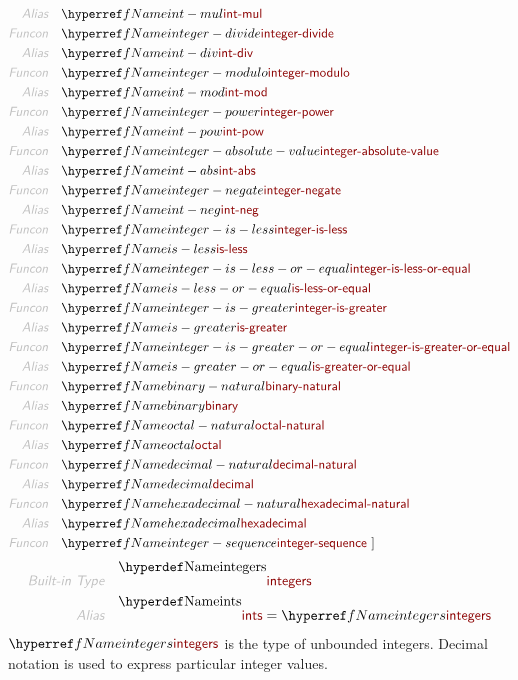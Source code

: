 \begin{align*}
  \KEY{Alias} \quad & \NAMEREF{int-mul} \\
  \KEY{Funcon} \quad & \NAMEREF{integer-divide} \\
  \KEY{Alias} \quad & \NAMEREF{int-div} \\
  \KEY{Funcon} \quad & \NAMEREF{integer-modulo} \\
  \KEY{Alias} \quad & \NAMEREF{int-mod} \\
  \KEY{Funcon} \quad & \NAMEREF{integer-power} \\
  \KEY{Alias} \quad & \NAMEREF{int-pow} \\
  \KEY{Funcon} \quad & \NAMEREF{integer-absolute-value} \\
  \KEY{Alias} \quad & \NAMEREF{int-abs} \\
  \KEY{Funcon} \quad & \NAMEREF{integer-negate} \\
  \KEY{Alias} \quad & \NAMEREF{int-neg} \\
  \KEY{Funcon} \quad & \NAMEREF{integer-is-less} \\
  \KEY{Alias} \quad & \NAMEREF{is-less} \\
  \KEY{Funcon} \quad & \NAMEREF{integer-is-less-or-equal} \\
  \KEY{Alias} \quad & \NAMEREF{is-less-or-equal} \\
  \KEY{Funcon} \quad & \NAMEREF{integer-is-greater} \\
  \KEY{Alias} \quad & \NAMEREF{is-greater} \\
  \KEY{Funcon} \quad & \NAMEREF{integer-is-greater-or-equal} \\
  \KEY{Alias} \quad & \NAMEREF{is-greater-or-equal} \\
  \KEY{Funcon} \quad & \NAMEREF{binary-natural} \\
  \KEY{Alias} \quad & \NAMEREF{binary} \\
  \KEY{Funcon} \quad & \NAMEREF{octal-natural} \\
  \KEY{Alias} \quad & \NAMEREF{octal} \\
  \KEY{Funcon} \quad & \NAMEREF{decimal-natural} \\
  \KEY{Alias} \quad & \NAMEREF{decimal} \\
  \KEY{Funcon} \quad & \NAMEREF{hexadecimal-natural} \\
  \KEY{Alias} \quad & \NAMEREF{hexadecimal} \\
  \KEY{Funcon} \quad & \NAMEREF{integer-sequence}
  \ ]
\end{align*}
\begin{align*}
  \KEY{Built-in Type} \quad 
  & \NAMEDECL{integers}  
\\
  \KEY{Alias} \quad
  & \NAMEDECL{ints} = \NAMEREF{integers}
\end{align*}
$\SHADE{\NAMEREF{integers}}$ is the type of unbounded integers. Decimal notation is used to
  express particular integer values.

